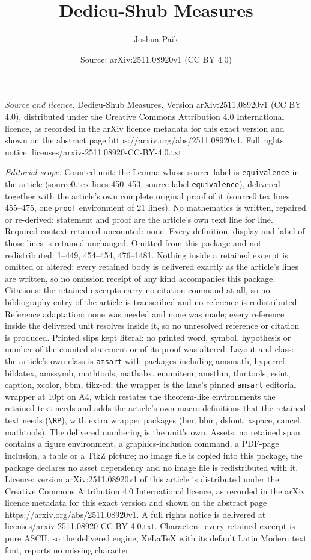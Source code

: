\documentclass[10pt,a4paper]{amsart}
\title[Dedieu-Shub Measures]{Dedieu-Shub Measures}
\author{Joshua Paik}
\date{Source: arXiv:2511.08920v1 (CC BY 4.0)}
\begin{document}
\maketitle

\noindent\emph{Source and licence.} Dedieu-Shub Measures. Version arXiv:2511.08920v1 (CC BY 4.0), distributed under the Creative Commons Attribution 4.0 International licence, as recorded in the arXiv licence metadata for this exact version and shown on the abstract page https://arxiv.org/abs/2511.08920v1. Full rights notice: licenses/arxiv-2511.08920-CC-BY-4.0.txt.\par\smallskip

\noindent\textit{Editorial scope.} Counted unit: the Lemma whose source label is \texttt{equivalence} in the article (source0.tex lines 450--453, source label \texttt{equivalence}), delivered together with the article's own complete original proof of it (source0.tex lines 455--475, one \texttt{proof} environment of 21 lines). No mathematics is written, repaired or re-derived: statement and proof are the article's own text line for line. Required context retained uncounted: none. Every definition, display and label of those lines is retained unchanged. Omitted from this package and not redistributed: 1--449, 454--454, 476--1481. Nothing inside a retained excerpt is omitted or altered: every retained body is delivered exactly as the article's lines are written, so no omission receipt of any kind accompanies this package. Citations: the retained excerpts carry no citation command at all, so no bibliography entry of the article is transcribed and no reference is redistributed. Reference adaptation: none was needed and none was made; every reference inside the delivered unit resolves inside it, so no unresolved reference or citation is produced. Printed slips kept literal: no printed word, symbol, hypothesis or number of the counted statement or of its proof was altered. Layout and class: the article's own class is \texttt{amsart} with packages including amsmath, hyperref, biblatex, amssymb, mathtools, mathabx, enumitem, amsthm, thmtools, esint, caption, xcolor, bbm, tikz-cd; the wrapper is the lane's pinned \texttt{amsart} editorial wrapper at 10pt on A4, which restates the theorem-like environments the retained text needs and adds the article's own macro definitions that the retained text needs (\texttt{\textbackslash RP}), with extra wrapper packages (bm, bbm, dsfont, xspace, cancel, mathtools). The delivered numbering is the unit's own. Assets: no retained span contains a figure environment, a graphics-inclusion command, a PDF-page inclusion, a table or a TikZ picture; no image file is copied into this package, the package declares no asset dependency and no image file is redistributed with it. Licence: version arXiv:2511.08920v1 of this article is distributed under the Creative Commons Attribution 4.0 International licence, as recorded in the arXiv licence metadata for this exact version and shown on the abstract page https://arxiv.org/abs/2511.08920v1. A full rights notice is delivered at licenses/arxiv-2511.08920-CC-BY-4.0.txt. Characters: every retained excerpt is pure ASCII, so the delivered engine, XeLaTeX with its default Latin Modern text font, reports no missing character.
\end{document}
